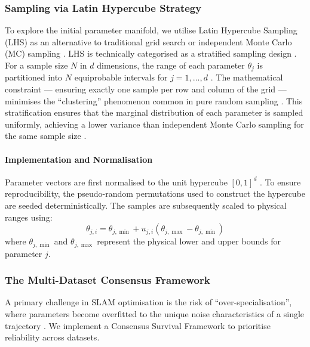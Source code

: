 \subsubsection{Sampling via Latin Hypercube Strategy}
To explore the initial parameter manifold, we utilise Latin Hypercube Sampling (LHS) as an alternative to traditional grid search or independent Monte Carlo (MC) sampling \cite{deutschLatinHypercubeSampling2012}. LHS is technically categorised as a stratified sampling design \cite{chrismanLatinHypercubeSampling2014}. For a sample size $N$ in $d$ dimensions, the range of each parameter $\theta_j$ is partitioned into $N$ equiprobable intervals for $j=1, \dots, d$ \cite{chrismanLatinHypercubeSampling2014}. The mathematical constraint --- ensuring exactly one sample per row and column of the grid --- minimises the ``clustering'' phenomenon common in pure random sampling \cite{deutschLatinHypercubeSampling2012}. This stratification ensures that the marginal distribution of each parameter is sampled uniformly, achieving a lower variance than independent Monte Carlo sampling for the same sample size \cite{packhamLatinHypercubeSampling2008}.

\paragraph{Implementation and Normalisation}
Parameter vectors are first normalised to the unit hypercube $[0, 1]^d$ \cite{deutschLatinHypercubeSampling2012}. To ensure reproducibility, the pseudo-random permutations used to construct the hypercube are seeded deterministically. The samples are subsequently scaled to physical ranges using:
\begin{equation}
    \theta_{j,i} = \theta_{j, \min} + u_{j,i} (\theta_{j, \max} - \theta_{j, \min})
\end{equation}
where $\theta_{j, \min}$ and $\theta_{j, \max}$ represent the physical lower and upper bounds for parameter $j$.

\subsubsection{The Multi-Dataset Consensus Framework}
A primary challenge in SLAM optimisation is the risk of ``over-specialisation'', where parameters become overfitted to the unique noise characteristics of a single trajectory \cite{soaresVARSLAMVisualAdaptive2025}. We implement a Consensus Survival Framework to prioritise reliability across datasets.

